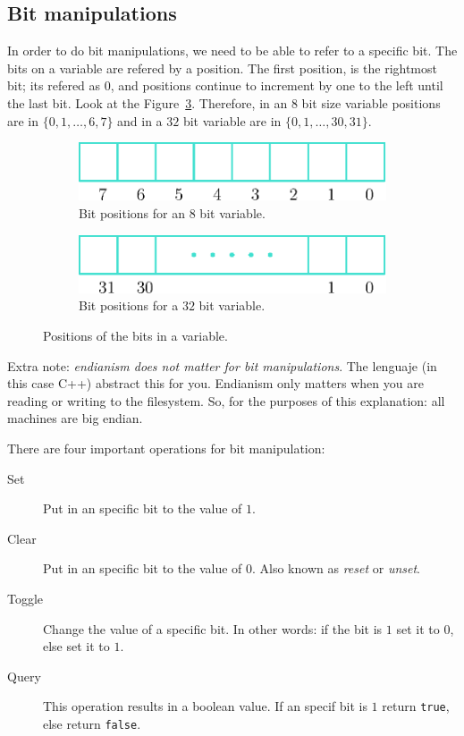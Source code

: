 \subsection{Bit manipulations}

In order to do bit manipulations, we need to be able to refer to a specific bit.
The bits on a variable are refered by a position.
The first position, is the rightmost bit; its refered as $0$, and positions continue to increment by one to the left until the last bit.
Look at the Figure~\ref{fig:bitPos}.
Therefore, in an $8$ bit size variable positions are in $\{ 0, 1, \ldots, 6, 7 \}$ and in a $32$ bit variable are in $\{ 0, 1, \ldots, 30, 31 \}$.

\begin{figure}[htb]
  \centering
  \begin{subfigure}[b]{0.35\textwidth}
    \includegraphics[width=\textwidth]{img/bitPositions}
    \caption{Bit positions for an $8$ bit variable.}
    \label{fig:bitPosa}
  \end{subfigure}
  \hspace*{1cm}
  \begin{subfigure}[b]{0.35\textwidth}
    \includegraphics[width=\textwidth]{img/bitPositions2}
    \caption{Bit positions for a $32$ bit variable.}
    \label{fig:bitPosb}
  \end{subfigure}
  \caption{Positions of the bits in a variable.}
  \label{fig:bitPos}
\end{figure}

Extra note: \emph{endianism does not matter for bit manipulations}.
The lenguaje (in this case C++) abstract this for you.
Endianism only matters when you are reading or writing to the filesystem.
So, for the purposes of this explanation: all machines are big endian.

There are four important operations for bit manipulation:
\begin{description}
\item[Set] Put in an specific bit to the value of $1$.
\item[Clear] Put in an specific bit to the value of $0$. Also known as \emph{reset} or \emph{unset}.
\item[Toggle] Change the value of a specific bit. In other words: if the bit is $1$ set it to $0$, else set it to $1$.
\item[Query] This operation results in a boolean value. If an specif bit is $1$ return \texttt{true}, else return \texttt{false}.
\end{description}

